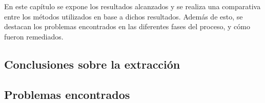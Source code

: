 \chapter{\ChapterThree{}}
\lhead{\emph{\ChapterThree{}}}

En este capítulo se expone los resultados alcanzados y se realiza una comparativa entre los métodos utilizados en base a dichos resultados.
%
Además de esto, se destacan los problemas encontrados en las diferentes fases del proceso, y cómo fueron remediados.

\section{Conclusiones sobre la extracción}


\section{Problemas encontrados}
